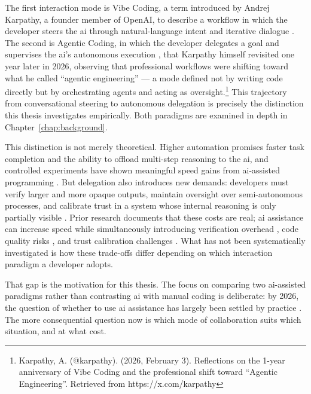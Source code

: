 The first interaction mode is Vibe Coding, a term introduced by Andrej Karpathy, a founder member of OpenAI, to describe a workflow in which the developer steers the \gls{ai} through natural-language intent and iterative dialogue \parencite{sapkota2025vibecoding}. The second is Agentic Coding, in which the developer delegates a goal and supervises the \gls{ai}'s autonomous execution \parencite{sapkota2025vibecoding, sarkar2025codewithme}, that Karpathy himself revisited one year later in 2026, observing that professional workflows were shifting toward what he called ``agentic engineering'' — a mode defined not by writing code directly but by orchestrating agents and acting as oversight.\footnote{Karpathy, A. (@karpathy). (2026, February 3). Reflections on the 1-year anniversary of Vibe Coding and the professional shift toward ``Agentic Engineering''. Retrieved from https://x.com/karpathy} This trajectory from conversational steering to autonomous delegation is precisely the distinction this thesis investigates empirically. Both paradigms are examined in depth in Chapter~\ref{chap:background}.

This distinction is not merely theoretical. Higher automation promises faster task completion and the ability to offload multi-step reasoning to the \gls{ai}, and controlled experiments have shown meaningful speed gains from \gls{ai}-assisted programming \parencite{peng2023copilot}. But delegation also introduces new demands: developers must verify larger and more opaque outputs, maintain oversight over semi-autonomous processes, and calibrate trust in a system whose internal reasoning is only partially visible \parencite[pp.~289--291]{parasuraman2000model}. Prior research documents that these costs are real; \gls{ai} assistance can increase speed while simultaneously introducing verification overhead \parencite[pp.~1--3]{vaithilingam2022expectation}, code quality risks \parencite{qodo2025codequality}, and trust calibration challenges \parencite[pp.~6--8]{barke2023trust}. What has not been systematically investigated is how these trade-offs differ depending on which interaction paradigm a developer adopts.

That gap is the motivation for this thesis. The focus on comparing two \gls{ai}-assisted paradigms rather than contrasting \gls{ai} with manual coding is deliberate: by 2026, the question of whether to use \gls{ai} assistance has largely been settled by practice \parencite{stackOverflow2025survey}. The more consequential question now is which mode of collaboration suits which situation, and at what cost.

